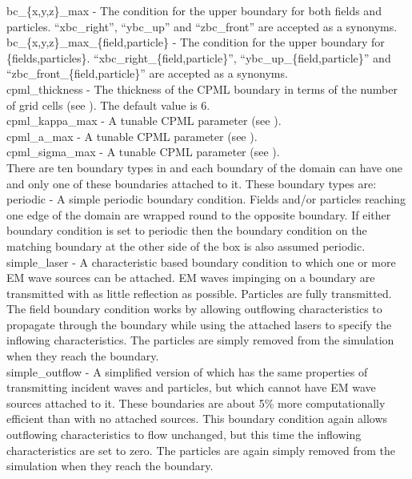 {\emphtext bc\_\{x,y,z\}\_max} - The condition for the upper boundary for both
fields and particles. ``xbc\_right'', ``ybc\_up'' and ``zbc\_front'' are
accepted as a synonyms.\\

{\emphtext bc\_\{x,y,z\}\_max\_\{field,particle\}} - The condition for the upper
boundary for \{fields,particles\}. ``xbc\_right\_\{field,particle\}'',
``ybc\_up\_\{field,particle\}'' and ``zbc\_front\_\{field,particle\}'' are
accepted as a synonyms.\\

{\emphtext cpml\_thickness} - The thickness of the CPML boundary in terms
  of the number of grid cells (see ). The default value is 6.\\

{\emphtext cpml\_kappa\_max} - A tunable CPML parameter (see ).\\

{\emphtext cpml\_a\_max} - A tunable CPML parameter (see ).\\

{\emphtext cpml\_sigma\_max} - A tunable CPML parameter (see ).\\

There are ten boundary types in {\EPOCH} and each boundary of the domain can
have one and only one of these boundaries attached to it. These boundary types
are:\\

{\emphtext periodic} - A simple periodic boundary condition. Fields and/or
particles reaching one edge of the domain are wrapped round to the opposite
boundary. If either boundary condition is set to periodic
then the boundary condition on the matching boundary at the other side of
the box is also assumed periodic.\\

{\emphtext simple\_laser} - A characteristic based boundary condition to which
one or more EM wave sources can be attached. EM waves impinging on a
 boundary are transmitted with as little reflection
as possible. Particles are fully transmitted. The field boundary condition
works by allowing outflowing characteristics to propagate through the boundary
while using the attached lasers to specify the inflowing characteristics. The
particles are simply removed from the simulation when they reach the
boundary.\\

{\emphtext simple\_outflow} - A simplified version of 
which has the same properties of transmitting incident waves and
particles, but which cannot have EM wave sources attached to it. These
boundaries are about 5\% more computationally efficient than
 with no attached sources. This boundary
condition again allows outflowing characteristics to flow unchanged, but this
time the inflowing characteristics are set to zero. The particles are again
simply removed from the simulation when they reach the boundary.\\

